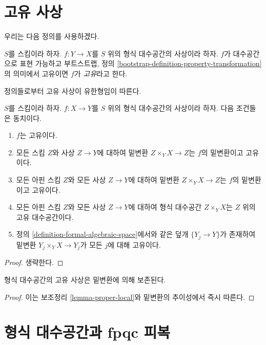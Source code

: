\section{고유 사상}
\label{section-proper}

\noindent
우리는 다음 정의를 사용하겠다.

\begin{definition}
\label{definition-proper}
$S$를 스킴이라 하자. $f : Y \to X$를 $S$ 위의 형식 대수공간의
사상이라 하자. $f$가 대수공간으로 표현 가능하고 부트스트랩, 정의
\ref{bootstrap-definition-property-transformation}의 의미에서 고유이면
$f$가 {\it 고유}라고 한다.
\end{definition}

\noindent
정의들로부터 고유 사상이 유한형임이 따른다.

\begin{lemma}
\label{lemma-proper-local}
$S$를 스킴이라 하자. $f : X \to Y$를 $S$ 위의 형식 대수공간의
사상이라 하자. 다음 조건들은 동치이다.
\begin{enumerate}
\item $f$는 고유이다.
\item 모든 스킴 $Z$와 사상 $Z \to Y$에 대하여 밑변환
$Z \times_Y X \to Z$는 $f$의 밑변환이고 고유이다.
\item 모든 아핀 스킴 $Z$와 모든 사상 $Z \to Y$에 대하여 밑변환
$Z \times_Y X \to Z$는 $f$의 밑변환이고 고유이다.
\item 모든 아핀 스킴 $Z$와 모든 사상 $Z \to Y$에 대하여 형식
대수공간 $Z \times_Y X$는 $Z$ 위의 고유 대수공간이다.
\item 정의 \ref{definition-formal-algebraic-space}에서와 같은 덮개
$\{Y_j \to Y\}$가 존재하여 밑변환
$Y_j \times_Y X \to Y_j$가 모든 $j$에 대해 고유이다.
\end{enumerate}
\end{lemma}

\begin{proof}
생략한다.
\end{proof}

\begin{lemma}
\label{lemma-base-change-proper}
형식 대수공간의 고유 사상은 밑변환에 의해 보존된다.
\end{lemma}

\begin{proof}
이는 보조정리 \ref{lemma-proper-local}와 밑변환의 추이성에서 즉시 따른다.
\end{proof}

\section{형식 대수공간과 fpqc 피복}
\label{section-fpqc}

